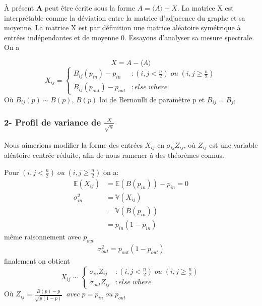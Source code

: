 À présent \textbf{A} peut être écrite sous la forme $A = \langle A \rangle + X$.
La matrice X est interprétable comme la déviation entre la matrice d'adjacence du graphe et sa moyenne.
La matrice X est par définition une matrice aléatoire symétrique à entrées indépendantes et de moyenne 0.
Essayons d'analyser sa mesure spectrale.
On a 

\begin{equation}
X = A - \langle A \rangle\nonumber
\end{equation}
\begin{equation}
	X_{ij}  = \left\{
	\begin{array}{lr}
		B_{ij}(p_{in}) - p_{in} & : (i,j < \frac{n}{2}) \; ou \; (i,j \ge \frac{n}{2}) \\
		B_{ij}(p_{out}) - p_{out} & : else \; where
	\end{array}
\right.\nonumber
\end{equation}
Où $B_{ij}(p) \sim B(p)$, $B(p)$ loi de Bernoulli de paramètre p et $B_{ij} = B_{ji}$\\


\subsubsection*{2- Profil de variance de $\frac{X}{\sqrt{n}}$}
Nous aimerions modifier la forme des entrées $X_{ij}$ en $\sigma_{ij} Z_{ij}$, où $Z_{ij}$ est une variable aléatoire centrée réduite, afin de nous ramener à des théorèmes connus.

Pour $(i,j < \frac{n}{2}) \; ou \; (i,j \ge \frac{n}{2}) $ on a:
\begin{align*}
\mathbb{E}(X_{ij}) &= \mathbb{E}(B(p_{in}))- p_{in} = 0\\
\sigma_{in}^2 &= \mathbb{V}(X_{ij}) \\ 
			  &= \mathbb{V}(B(p_{in})) \\
			  &= p_{in} (1 - p_{in})
\end{align*}
même raisonnement avec $p_{out}$ 
\begin{align*}
\sigma_{out}^2 =  p_{out} (1 - p_{out})
\end{align*}
finalement on obtient 
\begin{equation}
	X_{ij} \sim \left\{
	\begin{array}{lr}
		\sigma_{in} Z_{ij} & : (i,j < \frac{n}{2}) \; ou \; (i,j \ge \frac{n}{2}) \\
		\sigma_{out} Z_{ij} & : else \; where
	\end{array}
\right.\nonumber
\end{equation}
Où $Z_{ij} = \frac{B(p) - p}{\sqrt{p(1-p)}} \;\;avec \; p = p_{in} \; ou \; p_{out}$\\

